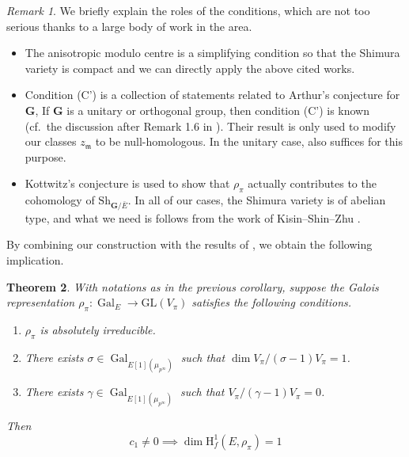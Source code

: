 \documentclass{amsart}
\newtheorem{theorem}{Theorem}[section]
\theoremstyle{definition}
\theoremstyle{remark}
\newtheorem{remark}[theorem]{Remark}
\newcommand{\1}{\mathbf{1}}
\newcommand{\GL}{\mathrm{GL}}
\newcommand{\h}{\mathrm{H}}
\newcommand{\m}{\mathfrak{m}}
\newcommand{\mb}[1]{\mathbf{#1}}
\DeclareMathOperator{\Gal}{Gal}
\theoremstyle{definition}
\newcommand{\bG}{\mathbf{G}}
\newcommand{\Sh}{\mathrm{Sh}}
\begin{document}
\begin{remark} We briefly explain the roles of the conditions, which are not too serious thanks to a large body of work in the area.
    \begin{itemize}
        \item The anisotropic modulo centre is a simplifying condition so that the Shimura variety is compact and we can directly apply the above cited works.
        \item Condition (C') is a collection of statements related to Arthur's conjecture for $\mb{G}$, If $\bG$ is a unitary or orthogonal group, then condition (C') is known (cf.~the discussion after Remark 1.6 in \cite{MorelSuh}). Their result is only used to modify our classes $z_\m$ to be null-homologous. In the unitary case, \cite[Proposition 6.9]{LL2021} also suffices for this purpose.
        \item Kottwitz's conjecture is used to show that $\rho_\pi$ actually contributes to the cohomology of $\Sh_{\bG/\bar{E}}$. In all of our cases, the Shimura variety is of abelian type, and what we need is follows from the work of Kisin--Shin--Zhu \cite{KSZ}.
    \end{itemize}
\end{remark}

By combining our construction with the results of \cite{JNS}, we obtain the following implication.
\begin{theorem}
    With notations as in the previous corollary, suppose the Galois representation $\rho_\pi:\Gal_E\to\GL(V_\pi)$ satisfies the following conditions.
    \begin{enumerate}
        \item $\rho_\pi$ is absolutely irreducible.
        \item There exists $\sigma\in\Gal_{E[1](\mu_{p^\infty})}$ such that $\dim V_\pi/(\sigma-1)V_\pi=1$.
        \item There exists $\gamma\in\Gal_{E[1](\mu_{p^\infty})}$ such that $V_\pi/(\gamma-1)V_\pi=0$.
    \end{enumerate}
    Then
    \[
        c_1\neq 0\implies\dim\h^1_f(E,\rho_\pi)=1
    \]
\end{theorem}
\end{document}
